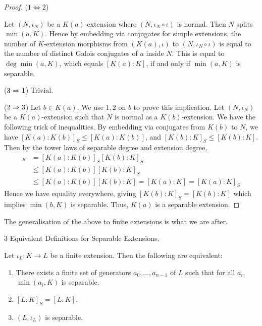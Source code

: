 \documentclass[../book.tex]{subfiles}
\begin{document}
\begin{proof}
    ($1\iff 2$)
    
        Let $(N,\iota_N)$ be a $K(a)$-extension where 
        $(N,\iota_N\circ\iota)$ is normal. 
        Then $N$ splits $\min(a,K)$. 
        Hence by embedding via conjugates for simple extensions,
        the number of $K$-extension morphisms 
        from $(K(a),\iota)$ to $(N,\iota_N\circ\iota)$
        is equal to the number of distinct Galois conjugates of $a$
        inside $N$. 
        This is equal to $\deg\min(a,K)$, which equals $[K(a):K]$,
        if and only if $\min(a,K)$ is separable. 
        
    ($3\Rightarrow 1$) 
        Trivial.
    
    ($2 \Rightarrow 3$)
        Let $b \in K(a)$. We use $1,2$ on $b$ to prove this implication. 
        Let $(N,\iota_N)$ be a $K(a)$-extension such that 
        $N$ is normal as a $K(b)$-extension. 
        We have the following trick of inequalities. 
        By embedding via conjugates from $K(b)$ to $N$, 
        we have $[K(a):K(b)]_S \leq [K(a):K(b)]$, and 
        $[K(b):K]_S \leq [K(b):K]$.
        Then by the tower laws of separable degree and extension degree,
        \begin{align*}
            [K(a) : K]_S &= [K(a):K(b)]_S [K(b):K]_S \\
            &\leq [K(a):K(b)] [K(b):K]_S \\
            &\leq [K(a):K(b)] [K(b):K] = [K(a):K] = [K(a):K]_S
        \end{align*}
        Hence we have equality everywhere, giving 
        $[K(b):K]_S = [K(b):K]$ which implies $\min(b,K)$ is separable.
        Thus, $K(a)$ is a separable extension. 
\end{proof}
The generalisation of the above to finite extensions is what we are after. 
\begin{thm} 3 Equivalent Definitions for Separable Extensions.
    
    Let $\iota_L : K \to L$ be a finite extension.
    Then the following are equivalent:
    \begin{enumerate}
        \item There exists a finite set of generators $a_0,\dots,a_{n-1}$ of $L$ 
            such that for all $a_i$, $\min(a_i,K)$ is separable. 
        \item $[L:K]_S = [L:K]$.
        \item $(L,\iota_L)$ is separable.
    \end{enumerate}
\end{thm}
\end{document}
